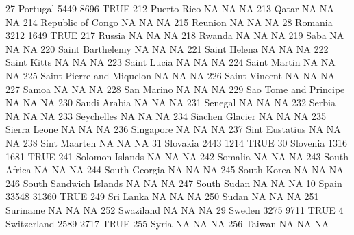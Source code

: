 \documentclass [a4paper] {article}
\begin{document}
\begin{Schunk}
\begin{Soutput}
27                             Portugal  5449  8696 TRUE
212                         Puerto Rico    NA    NA   NA
213                               Qatar    NA    NA   NA
214                   Republic of Congo    NA    NA   NA
215                             Reunion    NA    NA   NA
28                              Romania  3212  1649 TRUE
217                              Russia    NA    NA   NA
218                              Rwanda    NA    NA   NA
219                                Saba    NA    NA   NA
220                    Saint Barthelemy    NA    NA   NA
221                        Saint Helena    NA    NA   NA
222                         Saint Kitts    NA    NA   NA
223                         Saint Lucia    NA    NA   NA
224                        Saint Martin    NA    NA   NA
225           Saint Pierre and Miquelon    NA    NA   NA
226                       Saint Vincent    NA    NA   NA
227                               Samoa    NA    NA   NA
228                          San Marino    NA    NA   NA
229               Sao Tome and Principe    NA    NA   NA
230                        Saudi Arabia    NA    NA   NA
231                             Senegal    NA    NA   NA
232                              Serbia    NA    NA   NA
233                          Seychelles    NA    NA   NA
234                     Siachen Glacier    NA    NA   NA
235                        Sierra Leone    NA    NA   NA
236                           Singapore    NA    NA   NA
237                      Sint Eustatius    NA    NA   NA
238                        Sint Maarten    NA    NA   NA
31                             Slovakia  2443  1214 TRUE
30                             Slovenia  1316  1681 TRUE
241                     Solomon Islands    NA    NA   NA
242                             Somalia    NA    NA   NA
243                        South Africa    NA    NA   NA
244                       South Georgia    NA    NA   NA
245                         South Korea    NA    NA   NA
246              South Sandwich Islands    NA    NA   NA
247                         South Sudan    NA    NA   NA
10                                Spain 33548 31360 TRUE
249                           Sri Lanka    NA    NA   NA
250                               Sudan    NA    NA   NA
251                            Suriname    NA    NA   NA
252                           Swaziland    NA    NA   NA
29                               Sweden  3275  9711 TRUE
4                           Switzerland  2589  2717 TRUE
255                               Syria    NA    NA   NA
256                              Taiwan    NA    NA   NA

\end{Soutput}
\end{Schunk}
\end{document}
